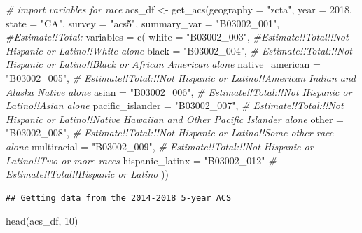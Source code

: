 \documentclass[
]{book}
\newenvironment{Shaded}{\begin{snugshade}}{\end{snugshade}}
\newcommand{\AttributeTok}[1]{\textcolor[rgb]{0.77,0.63,0.00}{#1}}
\newcommand{\CommentTok}[1]{\textcolor[rgb]{0.56,0.35,0.01}{\textit{#1}}}
\newcommand{\DecValTok}[1]{\textcolor[rgb]{0.00,0.00,0.81}{#1}}
\newcommand{\FunctionTok}[1]{\textcolor[rgb]{0.00,0.00,0.00}{#1}}
\newcommand{\NormalTok}[1]{#1}
\newcommand{\OtherTok}[1]{\textcolor[rgb]{0.56,0.35,0.01}{#1}}
\newcommand{\StringTok}[1]{\textcolor[rgb]{0.31,0.60,0.02}{#1}}
\begin{document}
\begin{Shaded}
\begin{Highlighting}[]
\CommentTok{\# import variables for race}
\NormalTok{acs\_df }\OtherTok{\textless{}{-}} 
  \FunctionTok{get\_acs}\NormalTok{(}\AttributeTok{geography =} \StringTok{"zcta"}\NormalTok{, }\AttributeTok{year =} \DecValTok{2018}\NormalTok{,}
          \AttributeTok{state =} \StringTok{"CA"}\NormalTok{, }\AttributeTok{survey =} \StringTok{"acs5"}\NormalTok{,}
          \AttributeTok{summary\_var =} \StringTok{"B03002\_001"}\NormalTok{, }\CommentTok{\#Estimate!!Total: }
          \AttributeTok{variables =} \FunctionTok{c}\NormalTok{(}
            \AttributeTok{white =} \StringTok{"B03002\_003"}\NormalTok{, }\CommentTok{\#Estimate!!Total!!Not Hispanic or Latino!!White alone}
            \AttributeTok{black =} \StringTok{"B03002\_004"}\NormalTok{, }\CommentTok{\# Estimate!!Total:!!Not Hispanic or Latino!!Black or African American alone}
            \AttributeTok{native\_american =} \StringTok{"B03002\_005"}\NormalTok{, }\CommentTok{\# Estimate!!Total:!!Not Hispanic or Latino!!American Indian and Alaska Native alone}
            \AttributeTok{asian =} \StringTok{"B03002\_006"}\NormalTok{, }\CommentTok{\# Estimate!!Total:!!Not Hispanic or Latino!!Asian alone}
            \AttributeTok{pacific\_islander =} \StringTok{"B03002\_007"}\NormalTok{, }\CommentTok{\# Estimate!!Total:!!Not Hispanic or Latino!!Native Hawaiian and Other Pacific Islander alone}
            \AttributeTok{other =} \StringTok{"B03002\_008"}\NormalTok{, }\CommentTok{\# Estimate!!Total:!!Not Hispanic or Latino!!Some other race alone}
            \AttributeTok{multiracial =} \StringTok{"B03002\_009"}\NormalTok{, }\CommentTok{\# Estimate!!Total:!!Not Hispanic or Latino!!Two or more races}
            \AttributeTok{hispanic\_latinx =} \StringTok{"B03002\_012"} \CommentTok{\# Estimate!!Total!!Hispanic or Latino}
\NormalTok{          ))}
\end{Highlighting}
\end{Shaded}

\begin{verbatim}
## Getting data from the 2014-2018 5-year ACS
\end{verbatim}

\begin{Shaded}
\begin{Highlighting}[]
\FunctionTok{head}\NormalTok{(acs\_df, }\DecValTok{10}\NormalTok{)}
\end{Highlighting}
\end{Shaded}
\end{document}
